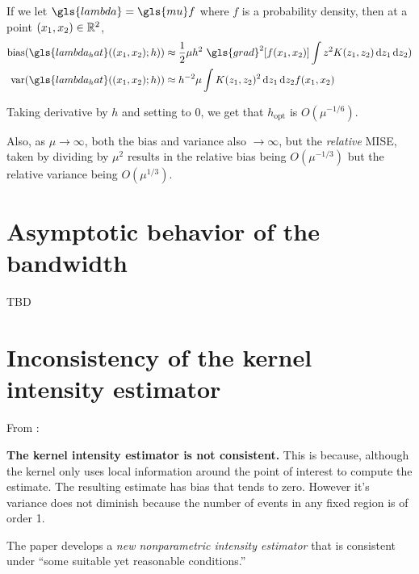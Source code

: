 If we let $\gls{lambda} = \gls{mu} f$ where $f$ is a probability density, then at a point $(x_1, x_2) \in \mathbb{R}^2$,
\begin{align}
    \mbox{bias}(\gls{lambda_hat}(\xvec;h)) & \approx
        \frac{1}{2} \mu h^2 ~ \gls{grad}^2\!\left[ f\xvec \right]
            \int { z^2 K(z_1, z_2) \diff{z_1} \diff{z_2)} } \\
    \mbox{var}(\gls{lambda_hat}(\xvec;h)) & \approx
        h^{-2} \mu
            \int { K(z_1, z_2)^2\diff{z_1} \diff{z_2} } f\xvec
\end{align}

Taking derivative by $h$ and setting to $0$, we get that $h_{\mbox{opt}}$ is $O(\mu^{-1/6})$.

Also, as $\mu \to \infty$, both the bias and variance also $\to \infty$,
but the \textit{relative} MISE, taken by dividing by $\mu^2$ results in the relative bias being $O(\mu^{-1/3})$
but the relative variance being $O(\mu^{1/3})$.

\section{Asymptotic behavior of the bandwidth}
\label{sec:theory:bandwidth}

TBD

\section{Inconsistency of the kernel intensity estimator}
\label{sec:theory:inconsistency}

From \citet{guan2008consistent}:

{
\color{red}
\textbf{The kernel intensity estimator is not consistent.}
This is because, although the kernel only uses local information around the point of interest to compute the estimate.
The resulting estimate has bias that tends to zero.
However it's variance does not diminish because the number of events in any fixed region is of order 1.
}

The paper develops a \textit{new nonparametric intensity estimator} that is consistent under ``some suitable yet reasonable conditions.''


